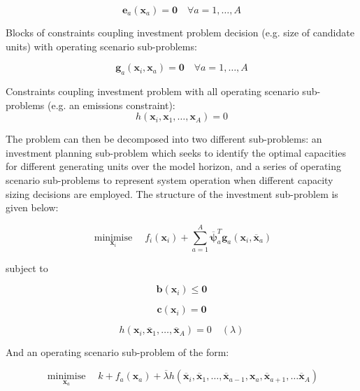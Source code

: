 \documentclass{article}
\DeclareMathOperator*{\minimise}{minimise}
\begin{document}
\begin{equation}
\bm{e}_{a}\left(\bm{x}_{a}\right) = \bm{0} \quad \forall a = 1,\ldots,A
\end{equation}

Blocks of constraints coupling investment problem decision (e.g. size of candidate units) with operating scenario sub-problems:

\begin{equation}
\bm{g}_{a}\left(\bm{x}_{i}, \bm{x}_{a}\right) = \bm{0} \quad \forall a = 1,\ldots,A
\end{equation}

Constraints coupling investment problem with all operating scenario sub-problems (e.g. an emissions constraint):
\begin{equation}
h\left(\bm{x}_{i}, \bm{x}_{1}, \ldots, \bm{x}_{A}\right) = 0
\end{equation}


The problem can then be decomposed into two different sub-problems: an investment planning sub-problem which seeks to identify the optimal capacities for different generating units over the model horizon, and a series of operating scenario sub-problems to represent system operation when different capacity sizing decisions are employed. The structure of the investment sub-problem is given below:

\begin{equation}
	\minimise\limits_{\bm{x}_{i}} \quad f_{i}(\bm{x}_{i}) + \sum\limits_{a=1}^{A} \overline{\bm{\psi}}_{a}^{T} \bm{g}_{a}\left(\bm{x}_{i}, \overline{\bm{x}}_{a}\right)
\end{equation}

subject to

\begin{equation}
\bm{b} \left(\bm{x}_{i}\right) \leq \bm{0}
\end{equation}

\begin{equation}
\bm{c} \left(\bm{x}_{i}\right) = \bm{0}
\end{equation}

\begin{equation}
h\left(\bm{x}_{i}, \overline{\bm{x}}_{1}, \ldots, \overline{\bm{x}}_{A}\right) = 0 \quad (\lambda)
\end{equation}

And an operating scenario sub-problem of the form:

\begin{equation}
\minimise\limits_{\bm{x}_{a}} \quad k + f_{a}(\bm{x}_{a}) + \overline{\lambda}h\left(\overline{\bm{x}}_{i}, \overline{\bm{x}}_{1}, \ldots, \overline{\bm{x}}_{a-1}, \bm{x}_{a}, \overline{\bm{x}}_{a+1}, \ldots \overline{\bm{x}}_{A}\right)
\end{equation}
\end{document}
